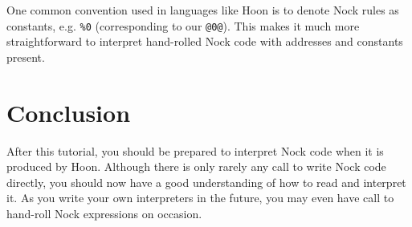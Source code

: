 \documentclass[twoside]{article}
\begin{document}
One common convention used in languages like Hoon is to denote Nock rules as constants, e.g. \@\lstinline[style=inlinecode]{%0} (corresponding to our \lstinline[style=inlinecode]{@0@}).  This makes it much more straightforward to interpret hand-rolled Nock code with addresses and constants present.

\section{Conclusion}

After this tutorial, you should be prepared to interpret Nock code when it is produced by Hoon.  Although there is only rarely any call to write Nock code directly, you should now have a good understanding of how to read and interpret it.  As you write your own interpreters in the future, you may even have call to hand-roll Nock expressions on occasion.

\end{document}
